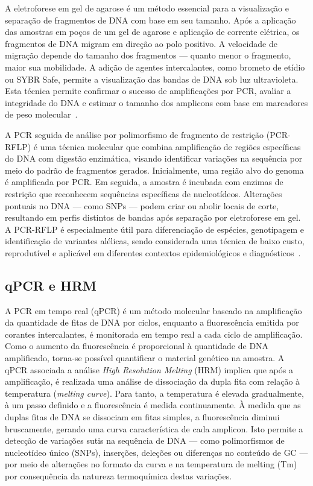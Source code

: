 A eletroforese em gel de agarose é um método essencial para a visualização e separação de fragmentos de DNA com base em seu tamanho. 
Após a aplicação das amostras em poços de um gel de agarose e aplicação de corrente elétrica, os fragmentos de DNA migram em direção 
ao polo positivo. A velocidade de migração depende do tamanho dos fragmentos — quanto menor o fragmento, maior sua mobilidade. 
A adição de agentes intercalantes, como brometo de etídio ou SYBR Safe, permite a visualização das bandas de DNA sob luz ultravioleta. 
Esta técnica permite confirmar o sucesso de amplificações por PCR, avaliar a integridade do DNA e estimar o tamanho dos amplicons 
com base em marcadores de peso molecular~\cite{costa1998leishmaniose}.

A PCR seguida de análise por polimorfismo de fragmento de restrição (PCR-RFLP) é uma técnica molecular que combina amplificação de regiões 
específicas do DNA com digestão enzimática, visando identificar variações na sequência por meio do padrão de fragmentos gerados. Inicialmente, 
uma região alvo do genoma é amplificada por PCR. Em seguida, a amostra é incubada com enzimas de restrição que reconhecem sequências específicas 
de nucleotídeos. Alterações pontuais no DNA — como SNPs — podem criar ou abolir locais de corte, resultando em perfis distintos de bandas após separação 
por eletroforese em gel. A PCR-RFLP é especialmente útil para diferenciação de espécies, genotipagem e identificação de variantes alélicas, sendo 
considerada uma técnica de baixo custo, reprodutível e aplicável em diferentes contextos epidemiológicos e diagnósticos~\cite{garcia2005metodos}.

\subsection{qPCR e HRM}
A PCR em tempo real (qPCR)  é um método molecular baseado na amplificação da
quantidade de fitas de DNA por ciclos, enquanto a fluorescência emitida por
corantes intercalantes, é monitorada em tempo real a cada ciclo de amplificação.
Como o aumento da fluorescência é proporcional à quantidade de DNA amplificado,
torna-se possível quantificar o material genético na amostra\cite{Galluzi2018}.
A qPCR associada a análise \textit{High Resolution Melting} (HRM) implica que
após a amplificação, é realizada uma análise de dissociação da dupla fita com
relação à temperatura (\textit{melting curve}). Para tanto, a temperatura é
elevada gradualmente, à um passo definido e a fluorescência é medida
continuamente. À medida que as duplas fitas de DNA se dissociam em fitas
simples, a fluorescência diminui bruscamente, gerando uma curva característica
de cada amplicon. Isto permite a detecção de variações sutis na sequência de DNA
— como polimorfismos de nucleotídeo único (SNPs), inserções, deleções ou
diferenças no conteúdo de GC — por meio de alterações no formato da curva e na
temperatura de melting (Tm)\cite{Wittwer2009} por consequência da natureza
termoquímica destas variações.

